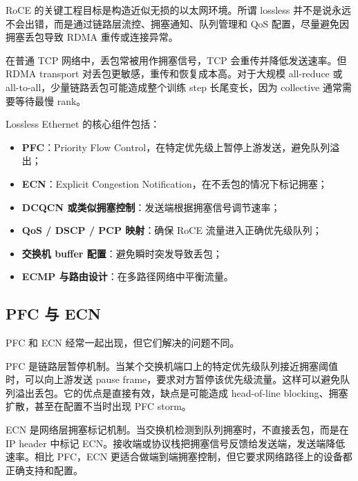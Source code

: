 RoCE 的关键工程目标是构造近似无损的以太网环境。所谓 lossless 并不是说永远不会出错，而是通过链路层流控、拥塞通知、队列管理和 QoS 配置，尽量避免因拥塞丢包导致 RDMA 重传或连接异常。

在普通 TCP 网络中，丢包常被用作拥塞信号，TCP 会重传并降低发送速率。但 RDMA transport 对丢包更敏感，重传和恢复成本高。对于大规模 all-reduce 或 all-to-all，少量链路丢包可能造成整个训练 step 长尾变长，因为 collective 通常需要等待最慢 rank。

Lossless Ethernet 的核心组件包括：

\begin{itemize}
  \item \textbf{PFC}：Priority Flow Control，在特定优先级上暂停上游发送，避免队列溢出；
  \item \textbf{ECN}：Explicit Congestion Notification，在不丢包的情况下标记拥塞；
  \item \textbf{DCQCN 或类似拥塞控制}：发送端根据拥塞信号调节速率；
  \item \textbf{QoS / DSCP / PCP 映射}：确保 RoCE 流量进入正确优先级队列；
  \item \textbf{交换机 buffer 配置}：避免瞬时突发导致丢包；
  \item \textbf{ECMP 与路由设计}：在多路径网络中平衡流量。
\end{itemize}

\subsection{PFC 与 ECN}
\label{subsec:pfc-ecn}

PFC 和 ECN 经常一起出现，但它们解决的问题不同。

PFC 是链路层暂停机制。当某个交换机端口上的特定优先级队列接近拥塞阈值时，可以向上游发送 pause frame，要求对方暂停该优先级流量。这样可以避免队列溢出丢包。它的优点是直接有效，缺点是可能造成 head-of-line blocking、拥塞扩散，甚至在配置不当时出现 PFC storm。

ECN 是网络层拥塞标记机制。当交换机检测到队列拥塞时，不直接丢包，而是在 IP header 中标记 ECN。接收端或协议栈把拥塞信号反馈给发送端，发送端降低速率。相比 PFC，ECN 更适合做端到端拥塞控制，但它要求网络路径上的设备都正确支持和配置。

